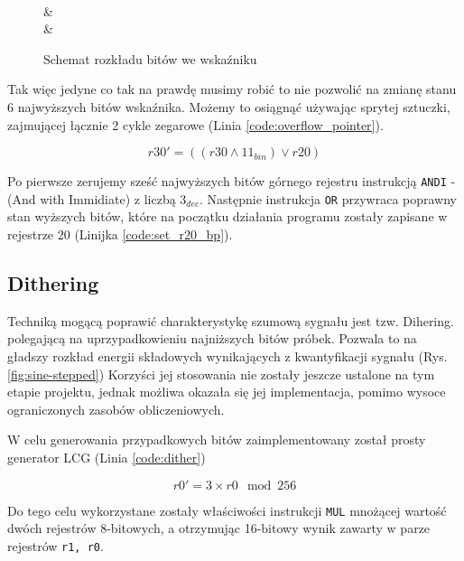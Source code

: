 \documentclass[12pt, a4paper]{article}
\begin{document}
\begin{figure}[h]
	\centering
	\hfill

	\begin{bytefield}[bitwidth=7mm,endianness=big]{16}
		 \\
		 & \\
		 & \\
	\end{bytefield}
	\caption{Schemat rozkładu bitów we wskaźniku}
	\label{fig:bits_ex}
\end{figure}

Tak więc jedyne co tak na prawdę musimy robić to nie pozwolić na zmianę stanu 6 najwyższych bitów wskaźnika.
Możemy to osiągnąć używając sprytej sztuczki, zajmującej łącznie 2 cykle zegarowe (Linia \ref{code:overflow_pointer}).

\begin{equation}
	r30' = \left( \left( r30 \wedge 11_{bin} \right) \vee r20 \right)
\end{equation}

Po pierwsze zerujemy sześć najwyższych bitów górnego rejestru instrukcją \verb|ANDI| - (And with Immidiate) z liczbą $3_{dec}$.
Następnie instrukcja \verb|OR| przywraca poprawny stan wyższych bitów, 
które na początku działania programu zostały zapisane w rejestrze 20 (Linijka \ref{code:set_r20_bp}).

\subsection{Dithering}
Techniką mogącą poprawić charakterystykę szumową sygnału jest tzw. Dihering. polegającą na uprzypadkowieniu najniższych bitów próbek.
Pozwala to na gładszy rozkład energii składowych wynikających z kwantyfikacji sygnału (Rys. \ref{fig:sine-stepped})
Korzyści jej stosowania nie zostały jeszcze ustalone na tym etapie projektu, jednak możliwa okazała się jej implementacja,
pomimo wysoce ograniczonych zasobów obliczeniowych.

W celu generowania przypadkowych bitów zaimplementowany został prosty generator LCG (Linia \ref{code:dither})

\begin{equation}
	r0'=3 \times r0 \mod 256
\end{equation}

Do tego celu wykorzystane zostały właściwości instrukcji \verb |MUL| mnożącej wartość dwóch rejestrów 8-bitowych,
a otrzymując 16-bitowy wynik zawarty w parze rejestrów \verb|r1, r0|.
\end{document}
